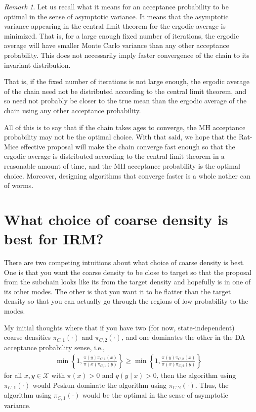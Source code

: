 \documentclass[12pt]{article}
\theoremstyle{definition}
\theoremstyle{remark}
\newtheorem{remark}[theorem]{Remark}
\theoremstyle{plain}
\begin{document}
\begin{remark}
  Let us recall what it means for an acceptance probability to be optimal in the sense of asymptotic variance.
  It means that the asymptotic variance appearing in the central limit theorem for the ergodic average is minimized.
  That is, for a large enough fixed number of iterations, the ergodic average will have smaller Monte Carlo variance than any other acceptance probability. 
  This does not necessarily imply faster convergence of the chain to its invariant distribution. 

  That is, if the fixed number of iterations is not large enough, 
  the ergodic average of the chain need not be distributed according to the central limit theorem, 
  and so need not probably be closer to the true mean than the ergodic average of the chain using any other acceptance probability.

  All of this is to say that if the chain takes ages to converge, 
  the MH acceptance probability may not be the optimal choice. 
  With that said, we hope that the Rat-Mice effective proposal 
  will make the chain converge fast enough so that the ergodic average 
  is distributed according to the central limit theorem in a reasonable amount of time, 
  and the MH acceptance probability is the optimal choice.
  Moreover, designing algorithms that converge faster is a whole nother can of worms.
\end{remark}

\section{What choice of coarse density is best for IRM?}

There are two competing intuitions about what choice of coarse density is best.
One is that you want the coarse density to be close to target so that the proposal from the subchain 
looks like its from the target density and hopefully is in one of its other modes. 
The other is that you want it to be flatter than the target density so that you can actually go through the 
regions of low probability to the modes. 

My initial thoughts where that if you have two (for now, state-independent) 
coarse densities $\pi_{C,1}(\cdot)$ and $\pi_{C,2}(\cdot)$, and one dominates the other 
in the DA acceptance probability sense, i.e., 
\begin{align*}
  \min\left\{1, \frac{\pi(y)\pi_{C,1}(x)}{\pi(x)\pi_{C,1}(y)}\right\}
  \geq
  \min\left\{1, \frac{\pi(y)\pi_{C,2}(x)}{\pi(x)\pi_{C,2}(y)}\right\}
\end{align*}
for all $x, y\in\mathcal X$ with $\pi(x)>0$ and $q(y\mid x)>0$,
then the algorithm using $\pi_{C,1}(\cdot)$ would Peskun-dominate the algorithm using $\pi_{C,2}(\cdot)$.
Thus, the algorithm using $\pi_{C,1}(\cdot)$ would be the optimal in the sense of asymptotic variance.
\end{document}
